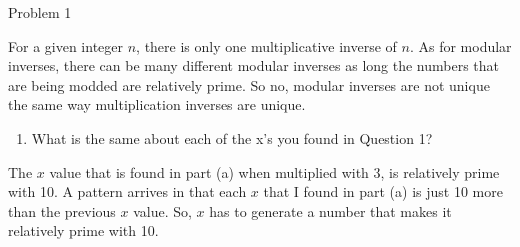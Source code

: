 \begin{problem}{Problem 1}
\begin{highlight}
        For a given integer $n$, there is only one multiplicative inverse of $n$. As for modular inverses, there can be many different modular inverses as long the numbers that are being modded
        are relatively prime. So no, modular inverses are not unique the same way multiplication inverses are unique.
    \end{highlight}

    \begin{highlight}
        \begin{enumerate}[label = (\alph*), start = 3]
            \item What is the same about each of the x's you found in Question 1?
        \end{enumerate}

        The $x$ value that is found in part (a) when multiplied with 3, is relatively prime with 10. A pattern arrives in that each $x$ that I found in part (a) is just 10 more than the previous
        $x$ value. So, $x$ has to generate a number that makes it relatively prime with 10.
    \end{highlight}
\end{problem}

